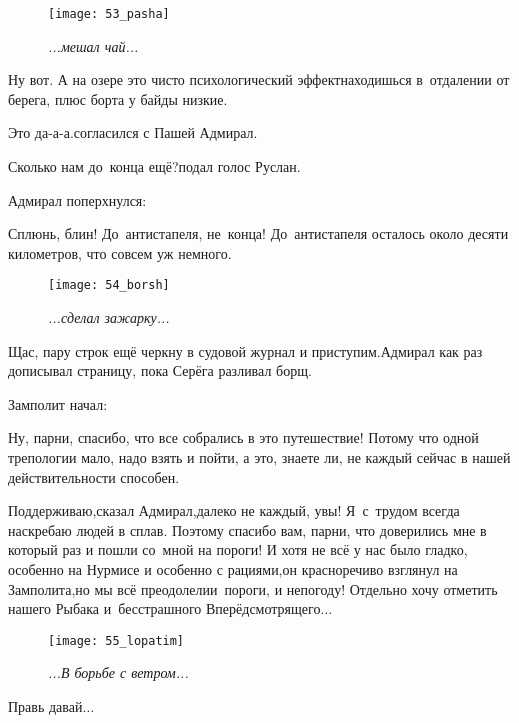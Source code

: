\newpage
\begin{wrapfigure}[17]{l}{0.50\textwidth}
	\centering
	\texttt{[image: 53\_pasha]}
	\caption{\small\textit{...мешал чай...}}
\end{wrapfigure}
\diagdash Ну вот. А на озере это чисто психологический эффект\mdash находишься в~отдалении от берега, плюс борта у байды низкие.

\diagdash Это да-а-а.\mdash согласился с Пашей Адмирал.

\diagdash Сколько нам до~конца ещё?\mdash подал голос Руслан.

Адмирал поперхнулся:

\diagdash Сплюнь, блин! До~антистапеля, не~конца! До~антистапеля осталось около десяти километров, что совсем уж немного.


\newpage
\begin{wrapfigure}[18]{l}{0.50\textwidth}
	\centering
	\texttt{[image: 54\_borsh]}
	\caption{\small\textit{...сделал зажарку...}}
\end{wrapfigure}
\mdash Щас, пару строк ещё черкну в судовой журнал и приступим.\mdash Адмирал как раз дописывал страницу, пока Серёга разливал борщ.


Замполит начал:

\diagdash Ну, парни, спасибо, что все собрались в это путешествие! Потому что одной трепологии мало, надо взять и пойти, а это, знаете ли, не каждый сейчас в нашей действительности способен. %

\diagdash Поддерживаю,\mdash сказал Адмирал,\mdash далеко не каждый, увы! Я~с~трудом всегда наскребаю людей в сплав. Поэтому спасибо вам, парни, что доверились мне в который раз и пошли со~мной на пороги! И хотя не всё у нас было гладко, особенно на Нурмисе и особенно с рациями,\mdash он красноречиво взглянул на Замполита,\mdash но мы всё преодолели\mdash и~пороги, и непогоду! Отдельно хочу отметить нашего Рыбака и~бесстрашного Вперёдсмотрящего$\ldots$

\newpage

\begin{wrapfigure}[15]{l}{0.58\textwidth}
	\centering
	\texttt{[image: 55\_lopatim]}
	\caption{\small\textit{...В борьбе с ветром...}}
\end{wrapfigure}
\diagdash Правь давай$\ldots$

